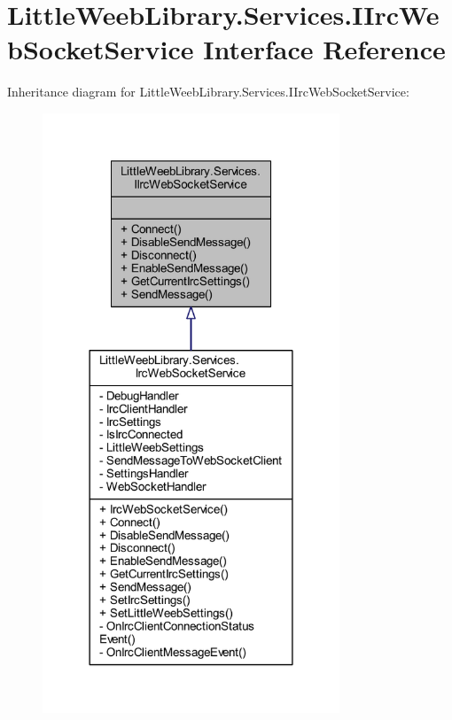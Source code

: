 \hypertarget{interface_little_weeb_library_1_1_services_1_1_i_irc_web_socket_service}{}\section{Little\+Weeb\+Library.\+Services.\+I\+Irc\+Web\+Socket\+Service Interface Reference}
\label{interface_little_weeb_library_1_1_services_1_1_i_irc_web_socket_service}


Inheritance diagram for Little\+Weeb\+Library.\+Services.\+I\+Irc\+Web\+Socket\+Service\+:\nopagebreak
\begin{figure}[H]
\begin{center}
\leavevmode
\includegraphics[width=251pt]{interface_little_weeb_library_1_1_services_1_1_i_irc_web_socket_service__inherit__graph}
\end{center}
\end{figure}


